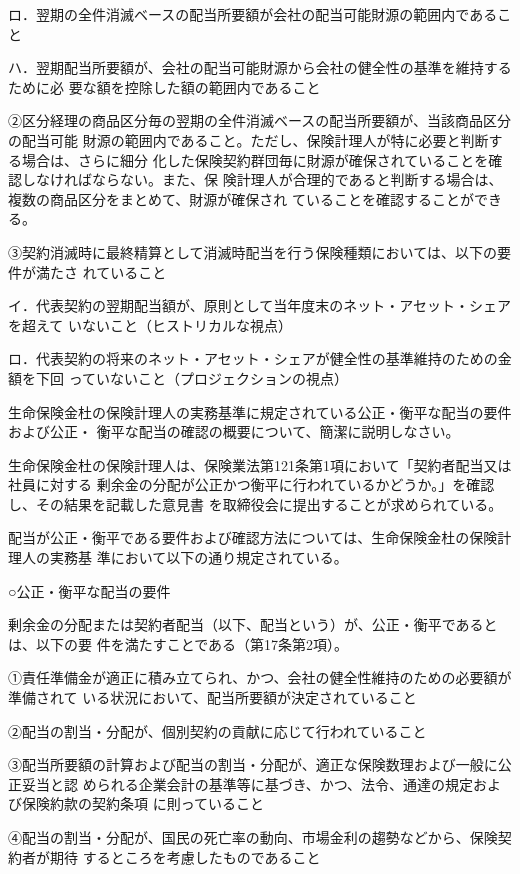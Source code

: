 \documentclass[report,gutter=10mm,fore-edge=10mm,uplatex,dvipdfmx]{jlreq}
\begin{document}
ロ．翌期の全件消滅ベースの配当所要額が会社の配当可能財源の範囲内であること

ハ．翌期配当所要額が、会社の配当可能財源から会社の健全性の基準を維持するために必
要な額を控除した額の範囲内であること

②区分経理の商品区分毎の翌期の全件消滅ベースの配当所要額が、当該商品区分の配当可能
財源の範囲内であること。ただし、保険計理人が特に必要と判断する場合は、さらに細分
化した保険契約群団毎に財源が確保されていることを確認しなければならない。また、保
険計理人が合理的であると判断する場合は、複数の商品区分をまとめて、財源が確保され
ていることを確認することができる。

③契約消滅時に最終精算として消滅時配当を行う保険種類においては、以下の要件が満たさ
れていること

イ．代表契約の翌期配当額が、原則として当年度末のネット・アセット・シェアを超えて
いないこと（ヒストリカルな視点）

ロ．代表契約の将来のネット・アセット・シェアが健全性の基準維持のための金額を下回
っていないこと（プロジェクションの視点）

生命保険金杜の保険計理人の実務基準に規定されている公正・衡平な配当の要件および公正・
衡平な配当の確認の概要について、簡潔に説明しなさい。

\answer{}
生命保険金杜の保険計理人は、保険業法第121条第1項において「契約者配当又は社員に対する
剰余金の分配が公正かつ衡平に行われているかどうか。」を確認し、その結果を記載した意見書
を取締役会に提出することが求められている。

配当が公正・衡平である要件および確認方法については、生命保険金杜の保険計理人の実務基
準において以下の通り規定されている。

○公正・衡平な配当の要件

剰余金の分配または契約者配当（以下、配当という）が、公正・衡平であるとは、以下の要
件を満たすことである（第17条第2項）。

①責任準備金が適正に積み立てられ、かつ、会社の健全性維持のための必要額が準備されて
いる状況において、配当所要額が決定されていること

②配当の割当・分配が、個別契約の貢献に応じて行われていること

③配当所要額の計算および配当の割当・分配が、適正な保険数理および一般に公正妥当と認
められる企業会計の基準等に基づき、かつ、法令、通達の規定および保険約款の契約条項
に則っていること

④配当の割当・分配が、国民の死亡率の動向、市場金利の趨勢などから、保険契約者が期待
するところを考慮したものであること
\end{document}
